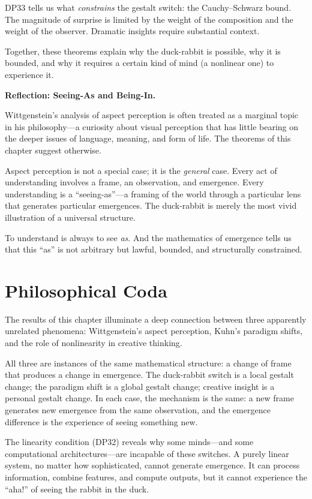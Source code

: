 DP33 tells us what \emph{constrains} the gestalt switch: the
Cauchy--Schwarz bound.  The magnitude of surprise is limited by the
weight of the composition and the weight of the observer.  Dramatic
insights require substantial context.

Together, these theorems explain why the duck-rabbit is possible,
why it is bounded, and why it requires a certain kind of mind
(a nonlinear one) to experience it.

\begin{reflectionbox}
\noindent\textbf{Reflection: Seeing-As and Being-In.}

Wittgenstein's analysis of aspect perception is often treated as a
marginal topic in his philosophy---a curiosity about visual
perception that has little bearing on the deeper issues of language,
meaning, and form of life.  The theorems of this chapter suggest
otherwise.

Aspect perception is not a special case; it is the \emph{general}
case.  Every act of understanding involves a frame, an observation,
and emergence.  Every understanding is a ``seeing-as''---a framing
of the world through a particular lens that generates particular
emergences.  The duck-rabbit is merely the most vivid illustration
of a universal structure.

To understand is always to see \emph{as}.  And the mathematics of
emergence tells us that this ``as'' is not arbitrary but lawful,
bounded, and structurally constrained.
\end{reflectionbox}

\section{Philosophical Coda}

The results of this chapter illuminate a deep connection between
three apparently unrelated phenomena: Wittgenstein's aspect perception,
Kuhn's paradigm shifts, and the role of nonlinearity in creative
thinking.

All three are instances of the same mathematical structure: a change
of frame that produces a change in emergence.  The duck-rabbit switch
is a local gestalt change; the paradigm shift is a global gestalt
change; creative insight is a personal gestalt change.  In each case,
the mechanism is the same: a new frame generates new emergence from
the same observation, and the emergence difference is the experience
of seeing something new.

The linearity condition (DP32) reveals why some minds---and some
computational architectures---are incapable of these switches.
A purely linear system, no matter how sophisticated, cannot generate
emergence.  It can process information, combine features, and compute
outputs, but it cannot experience the ``aha!'' of seeing the rabbit
in the duck.

